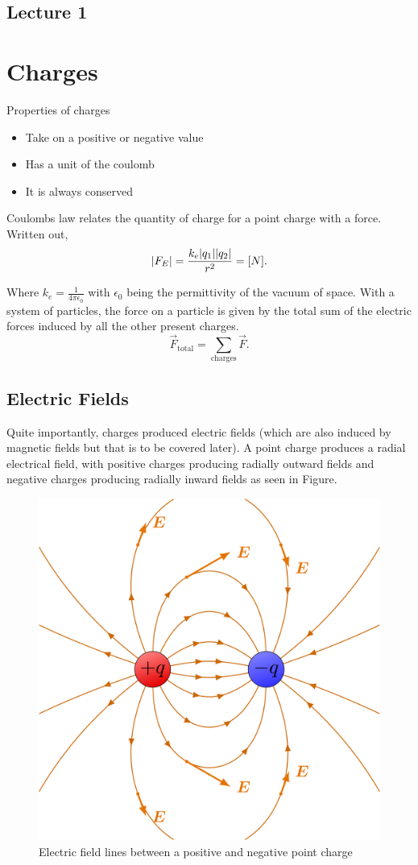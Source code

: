 \documentclass[../notes.tex]{subfiles}
\begin{document}
\begin{week}
\section*{Lecture 1}
\end{week}

\section{Charges}

Properties of charges

\begin{itemize}
	\item Take on a positive or negative value
	\item Has a unit of the coulomb
	\item It is always conserved
\end{itemize}


Coulombs law relates the quantity of charge for a point charge with a force. Written out,
\[
	\qty|F_{E}| = \frac{k_{e} \qty|q_{1}| \qty|q_{2}|}{r^2} = \qty[N]
.\]

Where $k_{e} = \frac{1}{4\pi\epsilon_0}$ with $\epsilon_0$ being the permittivity of the vacuum of space. With a system of particles, the force on a particle is given by the total sum of the electric forces induced by all the other present charges.
\[
	\vec{F}_{\text{total}} = \sum_\text{charges} \vec{F}
.\]

\subsection{Electric Fields}
Quite importantly, charges produced electric fields (which are also induced by magnetic fields but that is to be covered later). A point charge produces a radial electrical field, with positive charges producing radially outward fields and negative charges producing radially inward fields as seen in Figure.

\begin{figure}[h!]
	\centering
	\includegraphics[width=.4\linewidth]{figures/electric_field.png}
	\caption{Electric field lines between a positive and negative point charge}
\end{figure}
\end{document}
